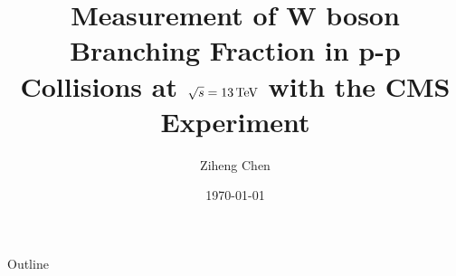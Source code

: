 \documentclass[xcolor=dvipsnames, 10pt]{beamer}
\title[\BWl measurement]{Measurement of W boson Branching Fraction in p-p Collisions at $\sqrt{s} = 13\,\text{Te\hspace{-.08em}V}$  with the CMS Experiment}
\date{\today}
\author[Z. Chen]{Ziheng Chen}
\institute[NWU]{Department of Physics and Astronomy, \\ Northwestern University}
\begin{document}
\begin{frame}{} \titlepage \end{frame}

\begin{frame}{Outline}
\setcounter{tocdepth}{2}
    \begin{columns}[t]
        \tableofcontents[sections={1-3}]

        \tableofcontents[sections={4-7}]
    \end{columns}
\end{frame}










\begin{frame}[allowframebreaks]
    \tiny{
    
    
    }
\end{frame}
\end{document}
